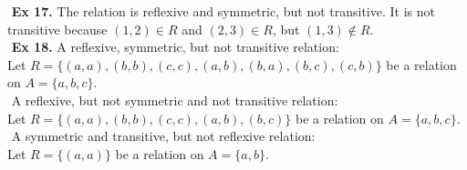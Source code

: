 \documentclass{article}
\begin{document}
$ $\newline
\noindent \textbf{Ex 17.} The relation is reflexive and symmetric, but not transitive. It is not transitive because $(1,2) \in R$ and $(2,3) \in R$, but $(1,3) \not\in R$.\\
$ $\newline
\noindent \textbf{Ex 18.}
\noindent A reflexive, symmetric, but not transitive relation:\\
Let $R=\{(a,a), (b,b), (c,c), (a,b), (b,a), (b,c), (c,b)\}$ be a relation on $A=\{a,b,c\}$.\\
$ $\newline
A reflexive, but not symmetric and not transitive relation:\\
Let $R=\{(a,a), (b,b), (c,c), (a,b), (b,c)\}$ be a relation on $A=\{a,b,c\}$.\\
$ $\newline
A symmetric and transitive, but not reflexive relation:\\
Let $R=\{(a,a)\}$ be a relation on $A=\{a,b\}$.\\
\end{document}
